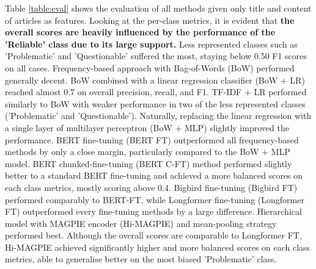 Table \ref{table:eval} shows the evaluation of all methods given only title and content of articles as features. Looking at the per-class metrics, it is evident that \textbf{the overall scores are heavily influenced by the performance of the 'Reliable' class due to its large support.} Less represented classes such as 'Problematic' and 'Questionable' suffered the most, staying below 0.50 F1 scores on all cases. Frequency-based approach with Bag-of-Words (BoW) performed generally decent. BoW combined with a linear regression classifier (BoW + LR) reached almost 0.7 on overall precision, recall, and F1. TF-IDF + LR performed similarly to BoW with weaker performance in two of the less represented classes ('Problematic' and 'Questionable'). Naturally, replacing the linear regression with a single layer of multilayer perceptron (BoW + MLP) slightly improved the performance. BERT fine-tuning (BERT FT) outperformed all frequency-based methods by only a close margin, particularly compared to the BoW + MLP model. BERT chunked-fine-tuning (BERT C-FT) method performed slightly better to a standard BERT fine-tuning and achieved a more balanced scores on each class metrics, mostly scoring above 0.4. Bigbird fine-tuning (Bigbird FT) performed comparably to BERT-FT, while Longformer fine-tuning (Longformer FT) outperformed every fine-tuning methods by a large difference. Hierarchical model with MAGPIE encoder (Hi-MAGPIE) and mean-pooling strategy performed best. Although the overall scores are comparable to Longformer FT, Hi-MAGPIE achieved significantly higher and more balanced scores on each class metrics, able to generalise better on the most biased 'Problematic' class.

